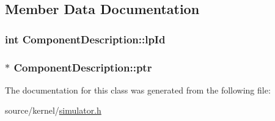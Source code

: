 \subsection{Member Data Documentation}
\hypertarget{classComponentDescription_79464b7b6ee786c1396e33afa503292f}{
\subsubsection[{lpId}]{\setlength{\rightskip}{0pt plus 5cm}int {\bf ComponentDescription::lpId}}}
\label{classComponentDescription_79464b7b6ee786c1396e33afa503292f}


\hypertarget{classComponentDescription_784cd2019b9d92de3206075c48aefdea}{
\subsubsection[{ptr}]{$\ast$ {\bf ComponentDescription::ptr}}}
\label{classComponentDescription_784cd2019b9d92de3206075c48aefdea}




The documentation for this class was generated from the following file:\begin{CompactItemize}
\item 
source/kernel/\hyperlink{simulator_8h}{simulator.h}\end{CompactItemize}
